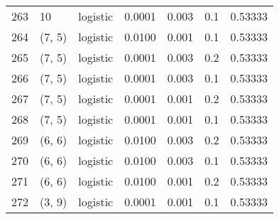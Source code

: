 \begin{tabular}{lllrrrr}
263 &          10 &  logistic &  0.0001 &  0.003 &  0.1 &   0.53333 \\
264 &      (7, 5) &  logistic &  0.0100 &  0.001 &  0.1 &   0.53333 \\
265 &      (7, 5) &  logistic &  0.0001 &  0.003 &  0.2 &   0.53333 \\
266 &      (7, 5) &  logistic &  0.0001 &  0.003 &  0.1 &   0.53333 \\
267 &      (7, 5) &  logistic &  0.0001 &  0.001 &  0.2 &   0.53333 \\
268 &      (7, 5) &  logistic &  0.0001 &  0.001 &  0.1 &   0.53333 \\
269 &      (6, 6) &  logistic &  0.0100 &  0.003 &  0.2 &   0.53333 \\
270 &      (6, 6) &  logistic &  0.0100 &  0.003 &  0.1 &   0.53333 \\
271 &      (6, 6) &  logistic &  0.0100 &  0.001 &  0.2 &   0.53333 \\
272 &      (3, 9) &  logistic &  0.0001 &  0.001 &  0.1 &   0.53333 \\
\bottomrule
\end{tabular}
